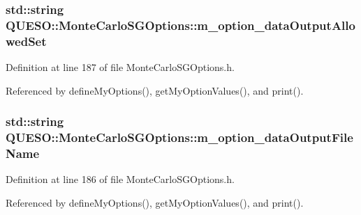 \hypertarget{class_q_u_e_s_o_1_1_monte_carlo_s_g_options_a169218cf0b3d8d8035bb826a963f5e11}{
\subsubsection[{m\-\_\-option\-\_\-data\-Output\-Allowed\-Set}]{\setlength{\rightskip}{0pt plus 5cm}std\-::string Q\-U\-E\-S\-O\-::\-Monte\-Carlo\-S\-G\-Options\-::m\-\_\-option\-\_\-data\-Output\-Allowed\-Set\hspace{0.3cm}{\ttfamily [private]}}}\label{class_q_u_e_s_o_1_1_monte_carlo_s_g_options_a169218cf0b3d8d8035bb826a963f5e11}


Definition at line 187 of file Monte\-Carlo\-S\-G\-Options.\-h.



Referenced by define\-My\-Options(), get\-My\-Option\-Values(), and print().

\hypertarget{class_q_u_e_s_o_1_1_monte_carlo_s_g_options_a057b072e55710c5effa4a5016e1d93ab}{
\subsubsection[{m\-\_\-option\-\_\-data\-Output\-File\-Name}]{\setlength{\rightskip}{0pt plus 5cm}std\-::string Q\-U\-E\-S\-O\-::\-Monte\-Carlo\-S\-G\-Options\-::m\-\_\-option\-\_\-data\-Output\-File\-Name\hspace{0.3cm}{\ttfamily [private]}}}\label{class_q_u_e_s_o_1_1_monte_carlo_s_g_options_a057b072e55710c5effa4a5016e1d93ab}


Definition at line 186 of file Monte\-Carlo\-S\-G\-Options.\-h.



Referenced by define\-My\-Options(), get\-My\-Option\-Values(), and print().

